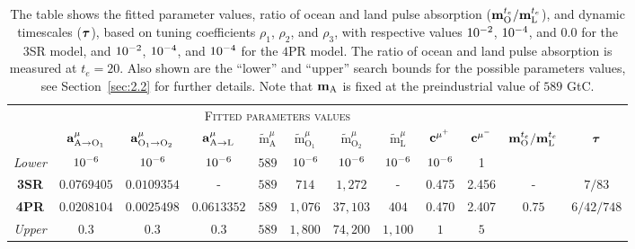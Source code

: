 \documentclass[11pt, a4paper, pdftex, twoside, dvipsnames]{article}
\renewcommand{\ref}{\cref}
\newcommand{\bb}[1]{\boldsymbol{\bold{#1}}}
\newcommand{\bbt}[1]{\tilde{\boldsymbol{\mathrm{#1}}}}
\newcommand{\expnum}[2]{
\ifnum#1=1 
  10^{#2} 
\else 
  #1 \! \cdot \! 10^{#2}
\fi
}
\begin{document}
\begin{table}[t]
\centering
\small
\begin{tabular}{cccccccccc||cc}
& 
\multicolumn{9}{c}{\textsc{Fitted parameters values}} &  \\
&
	$\bb{a}^{\mu}_{\text{A}   \to \text{O}_1}$ & 
	$\bb{a}^{\mu}_{\text{O}_1 \to \text{O}_2}$ & 
	$\bb{a}^{\mu}_{\text{A}   \to \text{L}  }$ &
	$\bbt{m}^{\mu}_{\text{A}}$    &
	$\bbt{m}^{\mu}_{\text{O}_1}$  &
	$\bbt{m}^{\mu}_{\text{O}_2}$  &
	$\bbt{m}^{\mu}_{\text{L}}$   &
	$\bb{c}^{\mu^+}$ &
	$\bb{c}^{\mu^-}$ &
$\bb{m}_{\text{O}}^{t_e}/\bb{m}_{\text{L}}^{t_e} $ & 
$\bb{\tau}$
\\[4pt]
%
\toprule
\toprule
\textit{Lower}& $\expnum{1}{-6}$ & $\expnum{1}{-6}$  & $\expnum{1}{-6}$ & $589$ &  $\expnum{1}{-6}$    & $\expnum{1}{-6}$  & $\expnum{1}{-6}$ & $\expnum{1}{-6}$  & 1 &  &\\
\textbf{3SR} & $\num{0.0769405}$ & $\num{0.0109354}$ & - & $589$ & $714 $    & $1,272 $  & - & 0.475 & 2.456 & - & $7/83$ \\
\textbf{4PR} & $\num{0.0208104}$ & $\num{0.0025498}$ & $\num{0.0613352}$ & $589$ & $1,076$ & $37,103$ & $404 $ & 0.470 & 2.407 & $0.75$  & $6/42/748$  \\
\textit{Upper}&   $0.3$ & $0.3$ & $0.3$  & $589$ & $1,800$ & $74,200$ & $1,100$ & $1$ & $5$ &  &\\
\end{tabular}
\caption{
The table shows the fitted parameter values, ratio of ocean and land pulse absorption ($\bb{m}_{\text{O}}^{t_e}/\bb{m}_{\text{L}}^{t_e} $), and dynamic timescales ($\bb{\tau}$), based on tuning coefficients $\rho_1$, $\rho_2$, and $\rho_3$, with respective values $\expnum{1}{-2}$, $\expnum{1}{-4}$, and $0.0$ for the 3SR model, and $\expnum{1}{-2}$, $\expnum{1}{-4}$, and $\expnum{1}{-4}$ for the $4$PR model.
%
The ratio of ocean and land pulse absorption is measured at $t_e=20$.
%
Also shown are the ``lower'' and ``upper'' search bounds for the possible parameters values, see Section~\ref{sec:2.2} for further details.
%
Note that $\bb{m}_{\text{A}}$ is fixed at the preindustrial value of $589$ GtC.
}
\label{tab:1}
\end{table}
\end{document}
